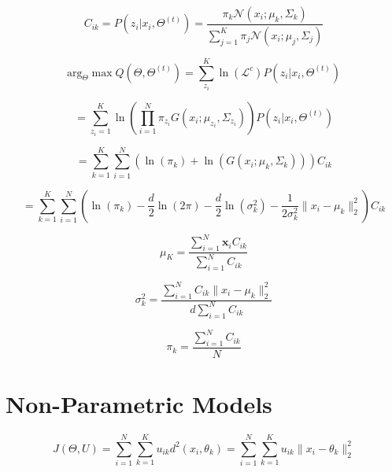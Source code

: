 \documentclass[10pt]{article}
\begin{document}
\begin{multicols}{2}
\begin{equation*}
    C_{ik} = P(z_i | x_i, \Theta^{(t)}) = \frac{\pi_{k} \mathcal{N}(x_i ; \mu_{k}, \Sigma_{k})}{\sum_{j=1}^{K} \pi_{j} \mathcal{N}(x_i ; \mu_{j}, \Sigma_{j})}
\end{equation*}

\begin{equation*}
    \text{arg}_{\Theta} \max Q(\Theta, \Theta^{(t)}) = \sum_{z_i}^{K} \ln(\mathcal{L}^c) P(z_i | x_i, \Theta^{(t)})
\end{equation*}

\begin{equation*}
    = \sum_{z_i = 1}^{K} \ln(\prod_{i=1}^{N} \pi_{z_{i}} G(x_i ; \mu_{z_{i}}, \Sigma_{z_{i}})) P(z_i | x_i, \Theta^{(t)})
\end{equation*}

\begin{equation*}
    = \sum_{k=1}^{K} \sum_{i=1}^{N} (\ln(\pi_{k}) + \ln(G(x_i ; \mu_{k}, \Sigma_{k}))) C_{ik}
\end{equation*}

\begin{equation*}
    = \sum_{k=1}^{K} \sum_{i=1}^{N} (\ln(\pi_{k}) - \frac{d}{2}\ln(2\pi) - \frac{d}{2}\ln(\sigma_{k}^2) - \frac{1}{2\sigma_{k}^2}\lVert x_i - \mu_{k} \rVert^2_2) C_{ik}
\end{equation*}

\begin{equation*}
    \mu_{K} = \frac{\sum_{i=1}^{N}\mathbf{x}_i C_{ik}}{\sum_{i=1}^{N} C_{ik}}
\end{equation*}

\begin{equation*}
    \sigma_{k}^2 = \frac{\sum_{i=1}^{N} C_{ik} \lVert x_i - \mu_{k} \rVert^2_2}{d \sum_{i=1}^{N} C_{ik}}
\end{equation*}

\begin{equation*}
    \pi_{k} = \frac{\sum_{i=1}^{N} C_{ik}}{N}
\end{equation*}

\section*{Non-Parametric Models}

\begin{equation*}
    J(\Theta, U) = \sum_{i=1}^{N} \sum_{k=1}^{K} u_{ik} d^2(x_i, \theta_k) = \sum_{i=1}^{N} \sum_{k=1}^{K} u_{ik} \lVert x_i - \theta_k \rVert^2_2
\end{equation*}


\end{multicols}
\end{document}
